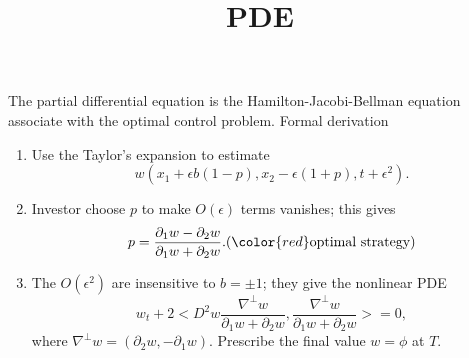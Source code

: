 \documentclass{beamer}
\begin{document}
\begin{frame}
\title{PDE}
The partial differential equation is the {\color{red}Hamilton-Jacobi-Bellman} equation associate with the optimal control problem.  Formal derivation 
\begin{enumerate}
	\item Use the Taylor's expansion to estimate
	$$w(x_1+\epsilon b(1-p),x_2-\epsilon(1+p),t+\epsilon^2).$$
	\item Investor choose $p$ to make $O(\epsilon)$ terms vanishes; this gives 
	$$p = \frac{\partial_1 w - \partial_2 w}{\partial_1 w + \partial_2 w}. ({\color{red}\text{optimal strategy}})$$ 
	\item The $O(\epsilon^2)$ are insensitive to $b = \pm 1$; they give the nonlinear PDE
	$$w_t + 2<D^2 w \frac{\nabla^\perp w}{\partial_1 w + \partial_2 w},\frac{\nabla^\perp w}{\partial_1 w+\partial_2 w}> = 0,$$
	where $\nabla^\perp w = (\partial_2 w,-\partial_1 w).$ Prescribe the final value $w = \phi$ at $T$.
\end{enumerate}
\end{frame}

%
\end{document}
